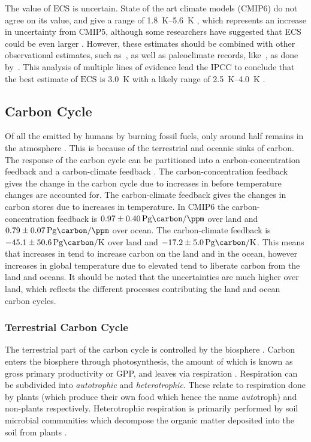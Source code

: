 The value of $\mathrm{ECS}$ is uncertain. State of the art climate models (CMIP6) do not agree on its value, and give a range of
\SIrange{1.8}{5.6}{\kelvin} \parencite{Zelinka2020}, which represents an increase in uncertainty from CMIP5, although some researchers have suggested that ECS could be even
larger \parencite{Stainforth2005}.
However, these estimates should be combined with other observational estimates, such as~\cite{Cox2018}, as well as paleoclimate records, like~\cite{Hargreaves2012}, as done by~\cite{Sherwood2020}.
This analysis of multiple lines of evidence lead the IPCC to conclude that the best estimate of $\mathrm{ECS}$ is \SI{3.0}{\kelvin} with a likely range of \SIrange{2.5}{4.0}{\kelvin} \parencite{AR6}.

\subsection{Carbon Cycle}
Of all the  emitted by humans by burning fossil fuels, only around half remains in the atmosphere \parencite{Friedlingstein2022}. This is because of the terrestrial and oceanic sinks of carbon.
The response of the carbon cycle can be partitioned into a carbon-concentration feedback and a carbon-climate feedback \parencite{Friedlingstein2006}. The carbon-concentration feedback
gives the change in the carbon cycle due to increases in  before temperature changes are accounted for. The carbon-climate feedback gives the changes in carbon stores due to increases
in temperature. In CMIP6 \parencite{Arora2020} the carbon-concentration feedback is $\SI{0.97\pm0.40}{\peta\gram\carbon\per\ppm}$ over land and $\SI{0.79\pm 0.07}{\peta\gram\carbon\per\ppm}$ over ocean.
The carbon-climate feedback is $\SI{-45.1\pm50.6}{\peta\gram\carbon\per\kelvin}$ over land and $\SI{-17.2\pm5.0}{\peta\gram\carbon\per\kelvin}$. This means that increases in  tend to
increase carbon on the land and in the ocean, however increases in global temperature due to elevated  tend to liberate carbon from the land and oceans. It should be noted
that the uncertainties are much higher over land, which reflects the different processes contributing the land and ocean carbon cycles.

\subsubsection{Terrestrial Carbon Cycle}
The terrestrial part of the carbon cycle is controlled by the biosphere \parencite{AR6}. Carbon enters the biosphere through photosynthesis, the amount of which is known as gross
primary productivity or GPP, and leaves via respiration \parencite{Jenkinson1991}. Respiration can be subdivided into \emph{autotrophic} and \emph{heterotrophic}.
These relate to respiration done by plants (which produce their own food which hence the name \emph{auto}troph) and non-plants respectively. Heterotrophic respiration
is primarily performed by soil microbial communities which decompose the organic matter deposited into the soil from plants \parencite{Singh1977}.

